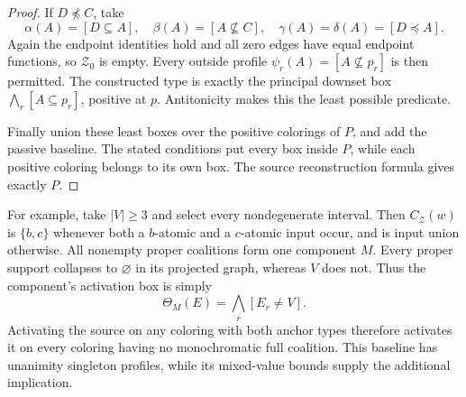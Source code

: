 \begin{proof}
If $D\npreceq C$, take
\[
 \alpha(A)=[D\subseteq A],\quad
 \beta(A)=[A\nsubseteq C],\quad
 \gamma(A)=\delta(A)=[D\preceq A].
\]
Again the endpoint identities hold and all zero edges have equal
endpoint functions, so $\mathcal Z_0$ is empty.
Every outside profile $\psi_r(A)=[A\nsubseteq p_r]$ is then
permitted. The constructed type is exactly the principal downset box
$\bigwedge_r[A\subseteq p_r]$, positive at $p$.
Antitonicity makes this the least possible predicate.

Finally union these least boxes over the positive colorings of $P$,
and add the passive baseline. The stated conditions put every box
inside $P$, while each positive coloring belongs to its own box.
The source reconstruction formula gives exactly $P$.
\end{proof}

For example, take $|V|\geq3$ and select every nondegenerate interval.
Then $C_{\mathcal Z}(w)$ is $\{b,c\}$ whenever both a $b$-atomic and
a $c$-atomic input occur, and is input union otherwise.
All nonempty proper coalitions form one component $M$.
Every proper support collapses to $\varnothing$ in its projected graph,
whereas $V$ does not. Thus the component's activation box is simply
\[
 \Theta_M(E)=\bigwedge_r[E_r\ne V].
\]
Activating the source on any coloring with both anchor types therefore
activates it on every coloring having no monochromatic full coalition.
This baseline has unanimity singleton profiles, while its mixed-value
bounds supply the additional implication.
